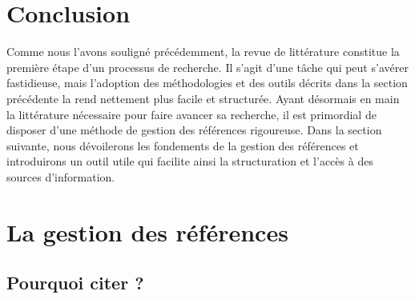 \documentclass[
  letterpaper,
  DIV=11,
  numbers=noendperiod]{scrreprt}
\begin{document}
\section{Conclusion}\label{conclusion-4}

Comme nous l'avons souligné précédemment, la revue de littérature
constitue la première étape d'un processus de recherche. Il s'agit d'une
tâche qui peut s'avérer fastidieuse, mais l'adoption des méthodologies
et des outils décrits dans la section précédente la rend nettement plus
facile et structurée. Ayant désormais en main la littérature nécessaire
pour faire avancer sa recherche, il est primordial de disposer d'une
méthode de gestion des références rigoureuse. Dans la section suivante,
nous dévoilerons les fondements de la gestion des références et
introduirons un outil utile qui facilite ainsi la structuration et
l'accès à des sources d'information.

\section{La gestion des
références}\label{la-gestion-des-ruxe9fuxe9rences}

\subsection{Pourquoi citer ?}\label{pourquoi-citer}
\end{document}
